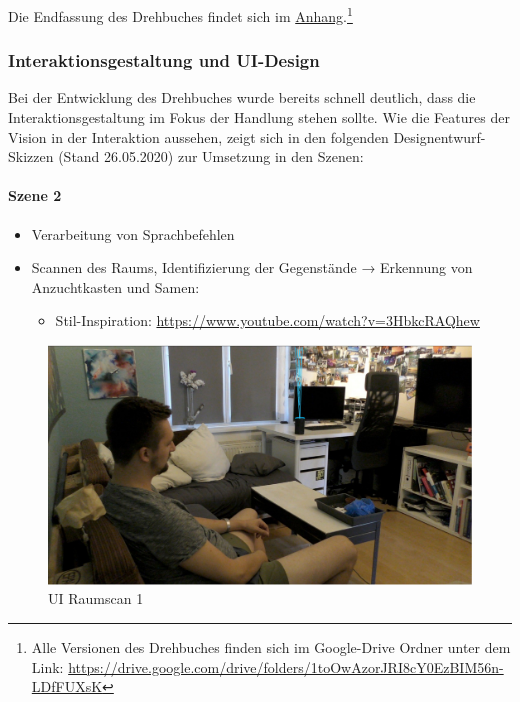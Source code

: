 Die Endfassung des Drehbuches findet sich im
\protect\hyperlink{anhang}{Anhang}.\footnote{Alle Versionen des
  Drehbuches finden sich im Google-Drive Ordner unter dem Link:
  \url{https://drive.google.com/drive/folders/1toOwAzorJRI8cY0EzBIM56n-LDfFUXsK}}

\hypertarget{interaktionsgestaltung-und-ui-design}{%
\subsubsection{Interaktionsgestaltung und
UI-Design}\label{interaktionsgestaltung-und-ui-design}}

Bei der Entwicklung des Drehbuches wurde bereits schnell deutlich, dass
die Interaktionsgestaltung im Fokus der Handlung stehen sollte. Wie die
Features der Vision in der Interaktion aussehen, zeigt sich in den
folgenden Designentwurf-Skizzen (Stand 26.05.2020) zur Umsetzung in den
Szenen:

\hypertarget{szene-2}{%
\paragraph{Szene 2}\label{szene-2}}

\begin{itemize}
\tightlist
\item
  Verarbeitung von Sprachbefehlen
\item
  Scannen des Raums, Identifizierung der Gegenstände → Erkennung von
  Anzuchtkasten und Samen:

  \begin{itemize}
  \tightlist
  \item
    Stil-Inspiration: \url{https://www.youtube.com/watch?v=3HbkcRAQhew}
  \end{itemize}
\end{itemize}

\begin{figure}
\centering
\includegraphics{img/UI/Raumscan1.png}
\caption{UI Raumscan 1}
\end{figure}

